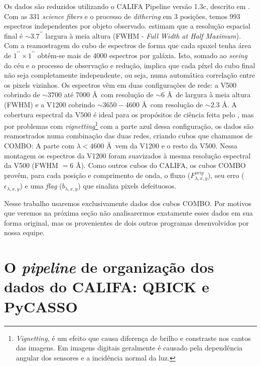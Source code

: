 Os dados são reduzidos utilizando o CALIFA Pipeline versão 1.3c, descrito em \citet{Husemann2013}. Com as 331 {\em
science fibers} e o processo de {\em dithering} em 3 posições, temos 993 espectros independentes por objeto observado.
\citet{Husemann2013} estimam que a resolução espacial final é $\sim3.7^{\prime\prime}$ largura à meia altura (FWHM -
{\em Full Width at Half Maximum}). Com a reamostragem do cubo de espectros de forma que cada spaxel tenha área de
$1^{\prime\prime} \times 1^{\prime\prime}$ obtêm-se mais de 4000 espectros por galáxia. Isto, somado ao {\em seeing} do
céu e o processo de observação e redução, implica que cada píxel do cubo final não seja completamente independente, ou
seja, numa automática correlação entre os pixels vizinhos. Os espectros vêm em duas configurações de rede: a V500
cobrindo de $\sim 3700$ até 7000 \AA\ com resolução de $\sim 6$ \AA\ de largura à meia altura (FWHM) e a V1200 cobrindo
$\sim 3650-4600$ \AA\ com resolução de $\sim2.3$ \AA. A cobertura espectral da V$500$ é ideal para os propósitos de
ciência feita pelo \starlight, mas por problemas com {\em vignetting}\footnote{{\em Vignetting}, é um efeito que causa
diferença de brilho e constraste nos cantos das imagens. Em imagens digitais geralmente é causado pela dependência
angular dos sensores e a incidência normal da luz.} com a parte azul dessa configuração, os dados são reamostrados numa
combinação das duas redes, criando cubos que chamamos de COMBO: A parte com $\lambda < 4600$ \AA\ vem da V1200 e o resto
da V500. Nessa montagem os espectros da V1200 foram suavizados à mesma resolução espectral da V500 (FWHM $= 6$ \AA).
Como outros cubos do CALIFA, os cubos COMBO provêm, para cada posição e comprimento de onda, o fluxo
($F_{\lambda,x,y}^{orig}$), seu erro ($\epsilon_{\lambda,x,y}$) e uma {\em flag} ($b_{\lambda,x,y}$) que sinaliza pixels
defeituosos.

Nesse trabalho usaremos exclusivamente dados dos cubos COMBO. Por motivos que veremos na próxima seção não analisarermos
exatamente esses dados em sua forma original, mas os provenientes de dois outros programas desenvolvidos por nossa
equipe.


\section{O {\em pipeline} de organização dos dados do CALIFA: QBICK e PyCASSO}
\label{sec:CALePyC:pipeline}

